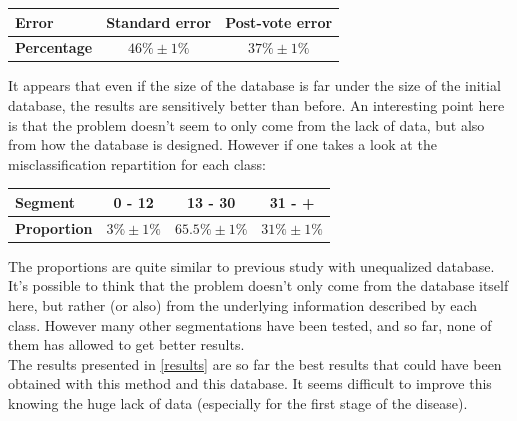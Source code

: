 \documentclass{report}
\begin{document}
	\vspace{0.5cm}
	\begin{center}
		\begin{tabular}{|l|c|c|}
			\hline \textbf{Error} & \textbf{Standard error} & \textbf{Post-vote error}\\
			\hline \textbf{Percentage} & $46\% \pm 1\%$ & $37\% \pm 1\%$\\
			\hline
		\end{tabular}
	\end{center}
	\vspace{0.5cm}
	
	It appears that even if the size of the database is far under the size of the initial database, the results are sensitively better than before. An interesting point here is that the problem doesn't seem to only come from the lack of data, but also from how the database is designed. However if one takes a look at the misclassification repartition for each class:
	
	\vspace{0.5cm}
	\begin{center}
		\begin{tabular}{|l|c|c|c|}
			\hline \textbf{Segment} & \textbf{0 - 12} & \textbf{13 - 30} & \textbf{31 - +}\\
			\hline \textbf{Proportion} & $3\% \pm 1\%$ & $65.5\% \pm 1\%$ & $31\% \pm 1\%$ \\
			\hline
		\end{tabular}
		\label{results}
	\end{center}
	\vspace{0.5cm}
	
	The proportions are quite similar to previous study with unequalized database. It's possible to think that the problem doesn't only come from the database itself here, but rather (or also) from the underlying information described by each class. However many other segmentations have been tested, and so far, none of them has allowed to get better results. \\
	
	The results presented in \ref{results} are so far the best results that could have been obtained with this method and this database. It seems difficult to improve this knowing the huge lack of data (especially for the first stage of the disease). 
	
	
\end{document}
